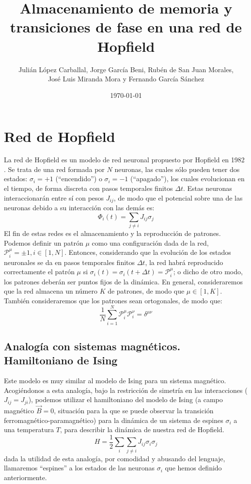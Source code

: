 \documentclass[titlepage,12pt]{article}
\title{\textbf{Almacenamiento de memoria y transiciones de fase en una red de Hopfield}}
\author{Julián López Carballal, Jorge García Beni, Rubén de San Juan Morales, \\ José Luis Miranda Mora y Fernando García Sánchez}
\date{\today}
\numberwithin{equation}{section}
\begin{document}
	\maketitle
	\fontsize{15pt}{0}\tableofcontents
	\newpage
	
	
	\section{Red de Hopfield}
	\fontsize{12pt}{0}
	La red de Hopfield es un modelo de red neuronal propuesto por Hopfield en 1982 \cite{hopfield82}. Se trata de una red formada por $N$ neuronas, las cuales sólo pueden tener dos estados: $\sigma_i = +1$ (``encendido'') o $\sigma_i=-1$ (``apagado''), los cuales evolucionan en el tiempo, de forma discreta con pasos temporales finitos $\Delta t$. Estas neuronas interaccionarán entre sí con pesos $J_{ij}$, de modo que el potencial sobre una de las neuronas debido a su interacción con las demás es:
	\begin{displaymath}
	\Phi_i(t)=\sum_{j\neq i} J_{ij}\sigma_j
	\end{displaymath}
	El fin de estas redes es el almacenamiento y la reproducción de patrones. Podemos definir un patrón $\mu$ como una configuración dada de la red, $\mathcal{P}^\mu_i = \pm1, i \in[1,N]$. Entonces, considerando que la evolución de los estados neuronales se da en pasos temporales finitos $\Delta t$, la red habrá reproducido correctamente el patrón $\mu$ si $\sigma_i(t)=\sigma_i(t+\Delta t)=\mathcal{P}^\mu_i$; o dicho de otro modo, los patrones deberán ser puntos fijos de la dinámica. En general, consideraremos que la red almacena un número $K$ de patrones, de modo que $\mu\in[1,K]$. También consideraremos que los patrones sean ortogonales, de modo que:
	\begin{equation}
	\frac{1}{N}\sum_{i=1}^N \mathcal{P}^\mu_i \mathcal{P}^\nu_i = \delta^{\mu\nu}
	\label{ortpat}
	\end{equation}
	\subsection{Analogía con sistemas magnéticos. Hamiltoniano de Ising}
	Este modelo es muy similar al modelo de Ising para un sistema magnético. Acogiéndonos a esta analogía, bajo la restricción de simetría en las interacciones ($J_{ij}=J_{ji}$), podemos utilizar el hamiltoniano del modelo de Ising (a campo magnético $\vec{B}=0$, situación para la que se puede observar la transición ferromagnético-paramagnético) para la dinámica de un sistema de espines $\sigma_i$ a una temperatura $T$, para describir la dinámica de nuestra red de Hopfield.
	\begin{equation}
	H = \frac{1}{2}\sum_{i}\sum_{j\neq i}J_{ij}\sigma_i\sigma_j
	\label{HIsing}
	\end{equation}
	dada la utilidad de esta analogía, por comodidad y abusando del lenguaje, llamaremos ``espines'' a los estados de las neuronas $\sigma_i$ que hemos definido anteriormente. 
\end{document}
